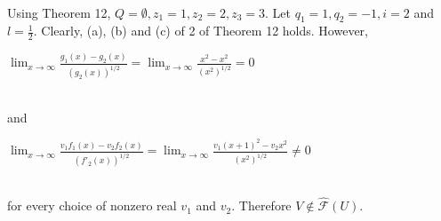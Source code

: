 \paragraph{}
\priklad Using Theorem 12, $Q = \emptyset, z_{1} = 1, z_{2} = 2, z_{3} = 3$. Let $q_{1} = 1, q_{2} = -1, i = 2$ and $l = \frac{1}{2}$. Clearly, (a), (b) and (c) of 2 of Theorem 12 holds. However, \\
\centerline{$\lim_{x\to \infty }\frac{g_{1}(x)-g_{2}(x)}{(g_{2}(x))^{1/2}} = \lim_{x\to \infty }\frac{x^{2}-x^{2}}{(x^{2})^{1/2}} = 0$} \\
and \\
\centerline{$\lim_{x\to \infty }\frac{v_{1}f_{1}(x)-v_{2}f_{2}(x)}{(f'_{2}(x))^{1/2}} = \lim_{x\to \infty }\frac{v_{1}(x+1)^{2}-v_{2}x^{2}}{(x^{2})^{1/2}} \neq 0$} \\
for every choice of nonzero real $v_{1}$ and $v_{2}$. Therefore $V \notin \hat{\mathcal{F}}(U)$.

